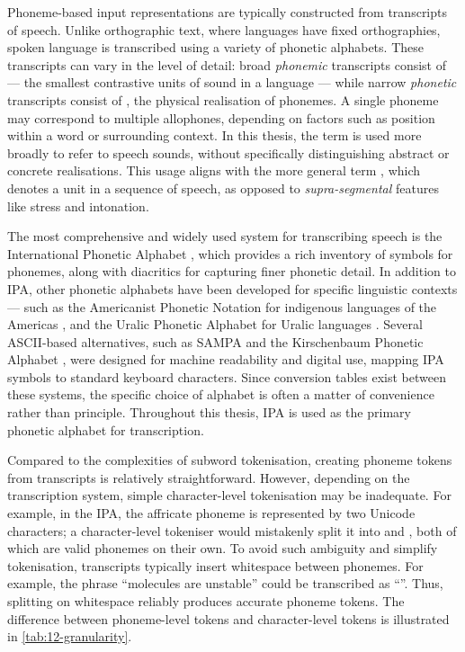 Phoneme-based input representations are typically constructed from transcripts of speech. Unlike orthographic text, where languages have fixed orthographies, spoken language is transcribed using a variety of phonetic alphabets. These transcripts can vary in the level of detail: broad \emph{phonemic} transcripts consist of  --- the smallest contrastive units of sound in a language --- while narrow \emph{phonetic} transcripts consist of , the physical realisation of phonemes. A single phoneme may correspond to multiple allophones, depending on factors such as position within a word or surrounding context. In this thesis, the term  is used more broadly to refer to speech sounds, without specifically distinguishing abstract or concrete realisations. This usage aligns with the more general term , which denotes a unit in a sequence of speech, as opposed to \emph{supra-segmental} features like stress and intonation. 

The most comprehensive and widely used system for transcribing speech is the International Phonetic Alphabet \citep[IPA][]{international1999handbook}, which provides a rich inventory of symbols for phonemes, along with diacritics for capturing finer phonetic detail. In addition to IPA, other phonetic alphabets have been developed for specific linguistic contexts --- such as the Americanist Phonetic Notation for indigenous languages of the Americas \citep{lehmann2013historical}, and the Uralic Phonetic Alphabet for Uralic languages \citep{abondolo1998uralic}. Several ASCII-based alternatives, such as SAMPA \citep{wells1992standard} and the Kirschenbaum Phonetic Alphabet \citep{kirshenbaum2011ascii}, were designed for machine readability and digital use, mapping IPA symbols to standard keyboard characters. Since conversion tables exist between these systems, the specific choice of alphabet is often a matter of convenience rather than principle. Throughout this thesis, IPA is used as the primary phonetic alphabet for transcription.

Compared to the complexities of subword tokenisation, creating phoneme tokens from transcripts is relatively straightforward. However, depending on the transcription system, simple character-level tokenisation may be inadequate. For example, in the IPA, the affricate phoneme  is represented by two Unicode characters; a character-level tokeniser would mistakenly split it into  and , both of which are valid phonemes on their own. To avoid such ambiguity and simplify tokenisation, transcripts typically insert whitespace between phonemes. For example, the phrase ``molecules are unstable'' could be transcribed as ``''. Thus, splitting on whitespace reliably produces accurate phoneme tokens. The difference between phoneme-level tokens and character-level tokens is illustrated in \cref{tab:12-granularity}.


